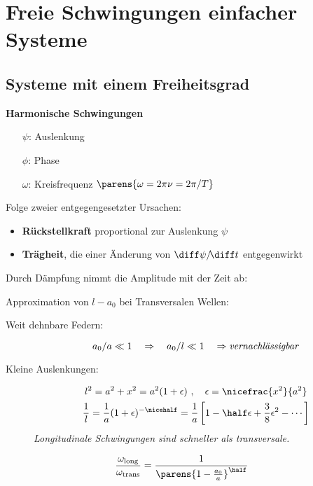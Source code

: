 
\section{Freie Schwingungen einfacher Systeme} %
	\subsection{Systeme mit einem Freiheitsgrad} %
		\textbf{Harmonische Schwingungen}
		\begin{itemize}
			\item[$\psi$:] Auslenkung
			\item[$\phi$:] Phase
			\item[$\omega$:] Kreisfrequenz $\parens{\omega = 2\pi\nu = 2\pi/T}$
		\end{itemize}
		
		Folge zweier entgegengesetzter Ursachen:
		\begin{itemize}
			\item \textbf{Rückstellkraft} proportional zur Auslenkung $\psi$
			\item \textbf{Trägheit}, die einer Änderung von $\diff \psi/\!\diff t$
				entgegenwirkt
		\end{itemize}
		
		Durch Dämpfung nimmt die Amplitude mit der Zeit ab:
		
		Approximation von $l - a_0$ bei Transversalen Wellen:
		\begin{description}
			\item[Weit dehnbare Federn:] \[
				a_0/a \ll 1 \quad \Rightarrow \quad a_0/l \ll 1 \quad
				\Rightarrow \text{\emph{vernachlässigbar}}
			\]
			\item[Kleine Auslenkungen:] \begin{gather*}
				l^2 = a^2 + x^2 = a^2(1+\epsilon)\ ,\quad \epsilon = \nicefrac{x^2}{a^2} \\
				\frac{1}{l} = \frac{1}{a}(1+\epsilon)^{-\nicehalf} = \frac{1}{a}\left[
					1 - \half\epsilon + \frac 3 8 \epsilon^2 - \cdots
				\right]
			\end{gather*}
			\emph{Longitudinale Schwingungen sind schneller als transversale.}
		\end{description}
		\[
			\frac{\omega_\text{long}}{\omega_\text{trans}} =
				\frac{1}{\parens{1-\frac{a_0}{a}}^\half}
		\]
	
